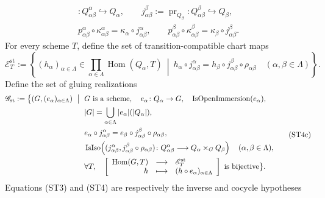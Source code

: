 \begin{definition}
\[\begin{gathered}
      \colon Q_{\alpha\beta}^{\alpha}\hookrightarrow Q_\alpha,
    \qquad
    j_{\alpha\beta}^{\beta}:=\operatorname{pr}_{Q_\beta}
      \colon Q_{\alpha\beta}^{\beta}\hookrightarrow Q_\beta,\\
    p_{\alpha\beta}^{\alpha}\circ
      \kappa_{\alpha\beta}^{\alpha}
      =\kappa_\alpha\circ j_{\alpha\beta}^{\alpha},
    \qquad
    p_{\alpha\beta}^{\beta}\circ
      \kappa_{\alpha\beta}^{\beta}
      =\kappa_\beta\circ j_{\alpha\beta}^{\beta}.
  \end{gathered}                                                   \tag{ST4a}
  \]
  For every scheme $T$, define the set of transition-compatible chart maps
  \[
    \mathscr E_T^{\mathrm{st}}:=
      \left\{
        (h_\alpha)_{\alpha\in\Lambda}
          \in\prod_{\alpha\in\Lambda}\operatorname{Hom}(Q_\alpha,T)
        \ \middle|\ 
        h_\alpha\circ j_{\alpha\beta}^{\alpha}
          =h_\beta\circ j_{\alpha\beta}^{\beta}
             \circ\rho_{\alpha\beta}
        \quad(\alpha,\beta\in\Lambda)
      \right\}.                                                   \tag{ST4b}
  \]
  Define the set of gluing realizations
  \[
  \begin{aligned}
    \mathscr G_{\mathrm{st}}:=
    \bigl\{(G,(e_\alpha)_{\alpha\in\Lambda})\ \bigm|\ {}&
      G\text{ is a scheme},\quad
      e_\alpha\colon Q_\alpha\to G,\quad
      \operatorname{IsOpenImmersion}(e_\alpha),\\
    &|G|=\bigcup_{\alpha\in\Lambda}|e_\alpha|(|Q_\alpha|),\\
    &e_\alpha\circ j_{\alpha\beta}^{\alpha}
       =e_\beta\circ j_{\alpha\beta}^{\beta}
          \circ\rho_{\alpha\beta},\\
    &\operatorname{IsIso}\!\left(
       (j_{\alpha\beta}^{\alpha},
          j_{\alpha\beta}^{\beta}\circ\rho_{\alpha\beta})
       \colon Q_{\alpha\beta}^{\alpha}
          \longrightarrow Q_\alpha\times_GQ_\beta\right)
       \quad(\alpha,\beta\in\Lambda),\\
    &\forall T,\quad
      \left[
      \begin{array}{rcl}
        \operatorname{Hom}(G,T)&\longrightarrow&\mathscr E_T^{\mathrm{st}}\\
        h&\longmapsto&(h\circ e_\alpha)_{\alpha\in\Lambda}
      \end{array}
      \right]\text{ is bijective}
      \bigr\}.
  \end{aligned}                                                     \tag{ST4c}
  \]
  Equations (ST3) and (ST4) are respectively the inverse and cocycle hypotheses

\end{definition}

